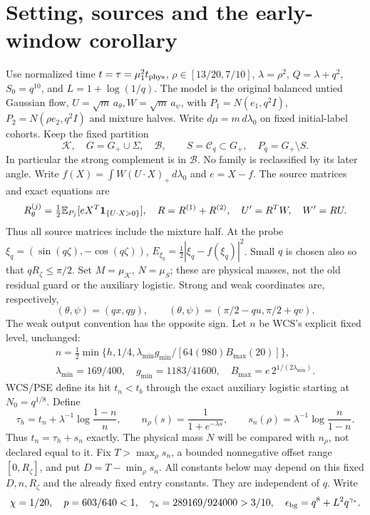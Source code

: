 \documentclass[11pt]{article}
\numberwithin{equation}{section}
\newcommand{\E}{\mathbb E}\newcommand{\dd}{\,d}
\newcommand{\KK}{\mathcal K}\newcommand{\BB}{\mathcal B}
\newcommand{\Gp}{G_+}\newcommand{\EE}{\mathfrak E}
\begin{document}
\section{Setting, sources and the early-window corollary}
\label{an07fwcv1:inventory}
Use normalized time \(t=\tau=\mu_1^2t_{\rm phys}\),
\(\rho\in[13/20,7/10]\), \(\lambda=\rho^2\),
\(Q=\lambda+q^2\), \(S_0=q^{10}\), and \(L=1+\log(1/q)\).
The model is the original balanced untied Gaussian flow,
\(U=\sqrt m\,a_\theta, W=\sqrt m\,a_\psi\), with
\(P_1=N(e_1,q^2I)\), \(P_2=N(\rho e_2,q^2I)\) and mixture halves.
Write \(d\mu=m\,d\lambda_0\) on fixed initial-label cohorts.
Keep the fixed partition
\[
 \KK,\quad G=\Gp\cup\Sigma,\quad\BB,\qquad
 S=\mathcal C_q\subset\Gp,\quad P_q=\Gp\setminus S.
\]
In particular the strong complement is in \(\BB\).
No family is reclassified by its later angle.
Write \(f(X)=\int W(U\cdot X)_+\,d\lambda_0\) and
\(e=X-f\). The source matrices and exact equations are
\[
 R^{(j)}_\theta=\tfrac12\E_{P_j}[eX^T\one_{\{U\cdot X>0\}}],
 \quad R=R^{(1)}+R^{(2)},\quad U'=R^TW,\quad W'=RU.
\]
Thus all source matrices include the mixture half.
At the probe \(\xi_q=(\sin(q\zeta),-\cos(q\zeta))\),
\(E_{\xi_q}=\tfrac12|\xi_q-f(\xi_q)|^2\).
Small \(q\) is chosen also so that \(qR_\zeta\le\pi/2\).
Set \(M=\mu_\KK\), \(N=\mu_S\); these are physical masses,
not the old residual guard or the auxiliary logistic.
Strong and weak coordinates are, respectively,
\[
 (\theta,\psi)=(qx,qy),\qquad
 (\theta,\psi)=(\pi/2-qu,\pi/2+qv).
\]
The weak output convention has the opposite sign.
Let \(n\) be WCS's explicit fixed level, unchanged:
\[
 \begin{gathered}
 n=\tfrac12\min\{h,1/4,
 \lambda_{\min}g_{\min}/[64(980)B_{\max}(20)]\},\\
 \lambda_{\min}=169/400,\quad g_{\min}=1183/41600,
 \quad B_{\max}=e\,2^{1/(2\lambda_{\min})}.
 \end{gathered}
\]
WCS/PSE define its hit \(t_n<t_b\) through the exact auxiliary
logistic starting at \(N_0=q^{1/8}\). Define
\begin{equation}
 \tau_h=t_n+\lambda^{-1}\log\frac{1-n}{n},\qquad
 n_\rho(s)=\frac1{1+e^{-\lambda s}},\qquad
 s_n(\rho)=\lambda^{-1}\log\frac n{1-n}.
 \label{an07fwcv1:time}
\end{equation}
Thus \(t_n=\tau_h+s_n\) exactly. The physical mass \(N\)
will be compared with \(n_\rho\), not declared equal to it.
Fix \(T>\max_\rho s_n\), a bounded nonnegative offset range
\([0,R_\zeta]\), and put
\(D=T-\min_\rho s_n\). All constants below may depend on this
fixed \(D,n,R_\zeta\) and the already fixed entry constants.
They are independent of \(q\). Write
\[
 \chi=1/20,\quad p=603/640<1,\quad
 \gamma_*=289169/924000>3/10,\quad
 \epsilon_{\rm bg}=q^8+L^2q^{\gamma_*}.
\]
\end{document}
